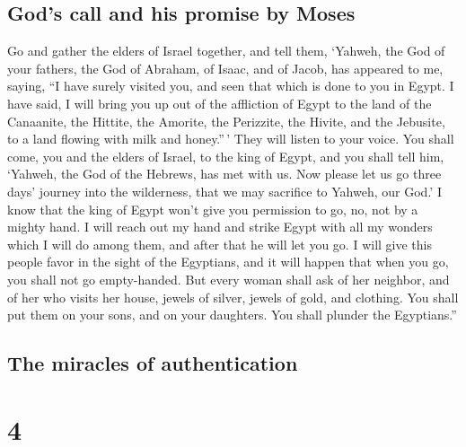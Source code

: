 \hypertarget{gods-call-and-his-promise-by-moses}{%
\subsection{God's call and his promise by
Moses}\label{gods-call-and-his-promise-by-moses}}

 Go and gather the elders of Israel together, and tell
them, `Yahweh, the God of your fathers, the God of Abraham, of Isaac,
and of Jacob, has appeared to me, saying, ``I have surely visited you,
and seen that which is done to you in Egypt.  I have
said, I will bring you up out of the affliction of Egypt to the land of
the Canaanite, the Hittite, the Amorite, the Perizzite, the Hivite, and
the Jebusite, to a land flowing with milk and honey.''\,'
 They will listen to your voice. You shall come, you and
the elders of Israel, to the king of Egypt, and you shall tell him,
`Yahweh, the God of the Hebrews, has met with us. Now please let us go
three days' journey into the wilderness, that we may sacrifice to
Yahweh, our God.'  I know that the king of Egypt won't
give you permission to go, no, not by a mighty hand.  I
will reach out my hand and strike Egypt with all my wonders which I will
do among them, and after that he will let you go.  I will
give this people favor in the sight of the Egyptians, and it will happen
that when you go, you shall not go empty-handed.  But
every woman shall ask of her neighbor, and of her who visits her house,
jewels of silver, jewels of gold, and clothing. You shall put them on
your sons, and on your daughters. You shall plunder the Egyptians.''

\hypertarget{the-miracles-of-authentication}{%
\subsection{The miracles of
authentication}\label{the-miracles-of-authentication}}

\hypertarget{section-3}{%
\section{4}\label{section-3}}

